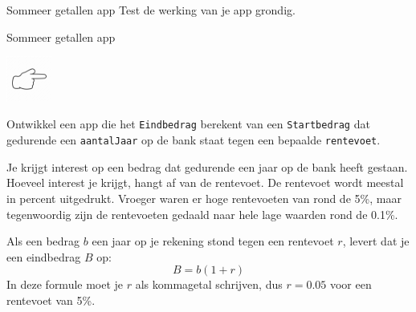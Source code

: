 \begin{opdracht}{Sommeer getallen app}
	Test de werking van je app grondig. 
	
	\opdrachteindbalk
	
\end{opdracht}

\begin{opdracht}{Sommeer getallen app}
	\begin{minipage}{.1\linewidth}
		\includegraphics[width=1.5cm]{inputs/opdracht}
		\vspace{1cm}
	\end{minipage}
	\begin{minipage}{.5\linewidth}
		Ontwikkel een app die het \texttt{Eindbedrag} berekent van een \texttt{Startbedrag} dat gedurende een \texttt{aantalJaar} op de bank staat tegen een bepaalde \texttt{rentevoet}.
	\end{minipage}
	\begin{minipage}{.3\linewidth}
	\end{minipage}

	Je krijgt interest op een bedrag dat gedurende een jaar op de bank heeft gestaan. Hoeveel interest je krijgt, hangt af van de rentevoet. De rentevoet wordt meestal in percent uitgedrukt. Vroeger waren er hoge rentevoeten van rond de 5\%, maar tegenwoordig zijn de rentevoeten gedaald naar hele lage waarden rond de 0.1\%. 
	
	Als een bedrag $b$ een jaar op je rekening stond tegen een rentevoet $r$, levert dat je een eindbedrag $B$ op:
	\begin{equation*}
	B = b(1+r)
	\end{equation*}
	In deze formule moet je $r$ als kommagetal schrijven, dus $r=0.05$ voor een rentevoet van 5\%.
	

\end{opdracht}

